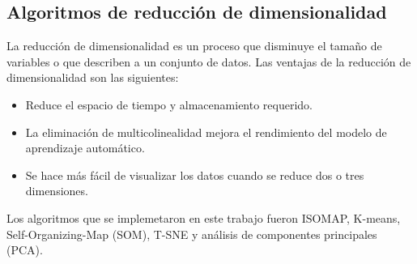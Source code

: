 \subsection{Algoritmos de reducción de dimensionalidad \label{sec:methods}}

La reducción de dimensionalidad es un proceso que disminuye el tamaño de variables o que describen a un conjunto de datos. Las ventajas de la reducción de dimensionalidad son las siguientes:

\begin{itemize}
    \item Reduce el espacio de tiempo y almacenamiento requerido.
    \item La eliminación de multicolinealidad mejora el rendimiento del modelo de aprendizaje automático.
    \item Se hace más fácil de visualizar los datos cuando se reduce dos o tres dimensiones.
\end{itemize}

Los algoritmos que se implemetaron en este trabajo fueron ISOMAP, K-means, Self-Organizing-Map (SOM), T-SNE y análisis de componentes principales (PCA).












